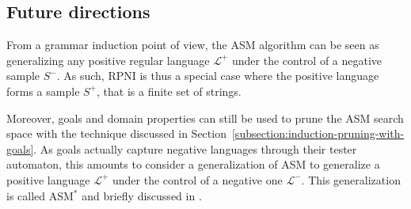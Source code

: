 \subsection{Future directions}

From a grammar induction point of view, the ASM algorithm can be seen as generalizing any positive regular language $\mathcal{L}^+$ under the control of a negative sample $S^-$. As such, RPNI is thus a special case where the positive language forms a sample $S^+$, that is a finite set of strings.

Moreover, goals and domain properties can still be used to prune the ASM search space with the technique discussed in Section~\ref{subsection:induction-pruning-with-goals}. As goals actually capture negative languages through their tester automaton, this amounts to consider a generalization of ASM to generalize a positive language $\mathcal{L}^+$ under the control of a negative one $\mathcal{L}^-$. This generalization is called ASM$^*$ and briefly discussed in \cite{Lambeau:2008}.
